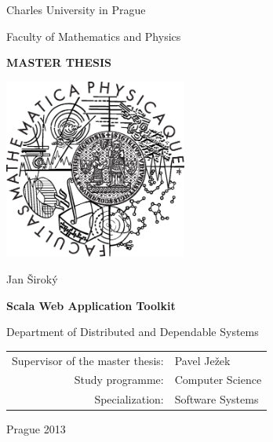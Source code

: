 \documentclass[12pt,a4paper]{report}
\begin{document}



\pagestyle{empty}

\begin{center}
\large Charles University in Prague
\medskip

Faculty of Mathematics and Physics

\vfill

{\bf\Large MASTER THESIS}

\vfill

\centerline{\mbox{\includegraphics[width=60mm]{img/Logo.eps}}}

\vfill

\vspace{5mm}

{\LARGE Jan Široký}

\vspace{15mm}

{\LARGE\bfseries Scala Web Application Toolkit}

\vfill

Department of Distributed and Dependable Systems

\vfill

\begin{tabular}{rl}
Supervisor of the master thesis: & Pavel Ježek \\
\noalign{\vspace{2mm}}
Study programme: & Computer Science \\
\noalign{\vspace{2mm}}
Specialization: & Software Systems \\
\end{tabular}

\vfill

Prague 2013
\end{center}
\end{document}
